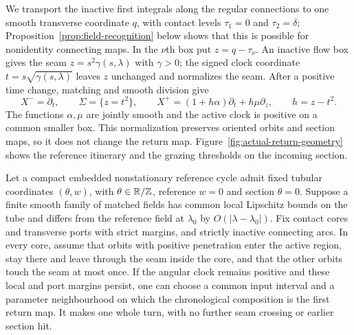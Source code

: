 We transport the inactive first integrals along the regular connections to
one smooth transverse coordinate $q$, with contact levels $\tau_1=0$ and
$\tau_2=\delta$; Proposition~\ref{prop:field-recognition} below shows that
this is possible for nonidentity connecting maps. In the $\nu$th box put
$z=q-\tau_\nu$. An inactive flow box gives the seam $z=s^2\gamma(s,\lambda)$
with $\gamma>0$; the signed clock coordinate $t=s\sqrt{\gamma(s,\lambda)}$
leaves $z$ unchanged and normalizes the seam. After a positive time change,
matching and smooth division give
\begin{equation}\label{eq:passage:local-geometry}
 X^-=\partial_t,\qquad \Sigma=\{z=t^2\},\qquad
 X^+=(1+h\alpha)\partial_t+h\mu\partial_z,
 \qquad h=z-t^2.
\end{equation}
The functions $\alpha,\mu$ are jointly smooth and the active clock is
positive on a common smaller box. This normalization preserves oriented
orbits and section maps, so it does not change the return map.
Figure~\ref{fig:actual-return-geometry} shows the reference itinerary and the
grazing thresholds on the incoming section.


\begin{lemma}\label{lem:common-tube}
Let a compact embedded nonstationary reference cycle admit fixed tubular
coordinates $(\theta,w)$, with $\theta\in\mathbb R/\mathbb Z$, reference $w=0$
and section $\theta=0$. Suppose a finite smooth family of matched fields
has common local Lipschitz bounds on the tube and differs from the
reference field at $\lambda_0$ by $O(|\lambda-\lambda_0|)$. Fix contact cores and transverse ports with
strict margins, and strictly inactive connecting arcs. In every core,
assume that orbits with positive penetration enter the active region, stay
there and leave through the seam inside the core, and that the other orbits
touch the seam at most once.
If the angular clock remains positive and these local and port margins
persist, one can choose a common input interval and a parameter neighbourhood
on which the chronological composition is the first return map. It makes one
whole turn, with no further seam crossing or earlier section hit.
\end{lemma}

